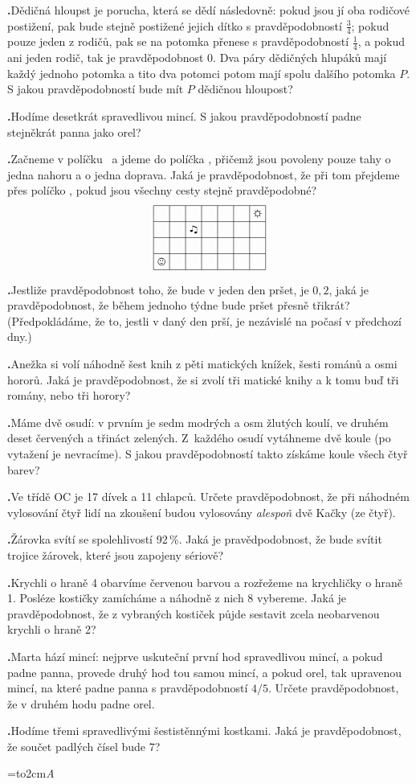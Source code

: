 \documentclass[11pt,a4paper]{article}
\newif\ifst
\def\printtym#1{\setbox\teambox=\hbox to2cm{\huge\textsl{#1}\hfil}\dp\teambox=0pt\relax\def\tym{#1}%
\pr0\relax\priklady\vfill\newpage}
\def\priklad#1#2{\advance\pr1 \noindent\ifst \stfalse\llap{$\star$ }\fi\textbf{\the\pr.}\space\ignorespaces#1\qquad [#2]\par\bigskip}
\let\stt=\sttrue
\begin{document}
{\stt\priklad{Dědičná hloupst je porucha, která se dědí následovně: pokud jsou jí oba rodičové postižení, pak bude stejně postižené jejich dítko s pravděpodobností $\frac34$; pokud pouze jeden z rodičů, pak se na potomka přenese s pravděpodobností $\frac14$, a pokud ani jeden rodič, tak je pravděpodobnost $0$. Dva páry dědičných hlupáků mají každý jednoho potomka a tito dva potomci potom mají spolu dalšího potomka $P$. S jakou pravděpodobností bude mít $P$ dědičnou hloupost?}{$33/64 = \left(\frac34\right)^2 \cdot \frac34 + 2\cdot \frac34 \cdot \frac14 \cdot \frac14$}
\priklad{Hodíme desetkrát spravedlivou mincí. S jakou pravděpodobností padne stejněkrát panna jako orel?}{$\binom{10}5/2^{10} = 63/256$}
\priklad{Začneme v políčku \smiley\ a jdeme do políčka \sun, přičemž jsou povoleny pouze tahy o jedna nahoru a o jedna doprava. Jaká je pravděpodobnost, že při tom přejdeme přes políčko \twonotes, pokud jsou všechny cesty stejně pravděpodobné?
\[ \begin{tikzpicture}[scale=.5] \draw (0,0) grid (7, 4); \node at(.5,.5) {\smiley}; \node at(2.5,2.5) {\twonotes}; \node at(6.5,3.5) {\sun}; \end{tikzpicture} \]}{$5/14 = \binom42 \cdot \binom51 / \binom93$}
\priklad{Jestliže pravděpodobnost toho, že bude v jeden den pršet, je $0{,}2$, jaká je pravděpodobnost, že během jednoho týdne bude pršet přesně třikrát? (Předpokládáme, že to, jestli v daný den prší, je nezávislé na počasí v předchozí dny.)}{$0{,}8^4 \cdot 0{,}2^3 \cdot \binom73 = 1792/15625 = 0{,}114688$}
\priklad{Anežka si volí náhodně šest knih z pěti matických knížek, šesti románů a osmi hororů. Jaká je pravděpodobnost, že si zvolí tři matické knihy a k tomu buď tři romány, nebo tři horory?}{$\binom53 \left(\binom 63 + \binom83\right)/\binom{19}6 = 10/357$}
\priklad{Máme dvě osudí: v prvním je sedm modrých a osm žlutých koulí, ve druhém deset červených a třináct zelených. Z~každého osudí vytáhneme dvě koule (po vytažení je nevracíme). S jakou pravděpodobností takto získáme koule všech čtyř barev?}{$7\cdot8\cdot10\cdot13/(\binom{15}2 \cdot \binom{23}2) = 208/759$}
\priklad{Ve třídě OC je 17 dívek a 11 chlapců. Určete pravděpodobnost, že při náhodném vylosování čtyř lidí na zkoušení budou vylosovány \emph{alespoň} dvě Kačky (ze čtyř).}{$\frac{\binom42 \cdot \binom{24}2 + \binom43 \cdot \binom{24}1 + \binom44 \cdot \binom{24}0}{\binom{28}4} = 1753/20475$}
\priklad{Žárovka svítí se spolehlivostí 92\,\%. Jaká je pravědpodobnost, že bude svítit trojice žárovek, které jsou zapojeny sériově?}{$0{,}92^3$}
\priklad{Krychli o hraně 4 obarvíme červenou barvou a rozřežeme na krychličky o hraně 1. Posléze kostičky zamícháme a náhodně z nich 8 vybereme. Jaká je pravděpodobnost, že z vybraných kostiček půjde sestavit zcela neobarvenou krychli o hraně 2?}{$1$}
\stt\priklad{Marta hází mincí: nejprve uskuteční první hod spravedlivou mincí, a pokud padne panna, provede druhý hod tou samou mincí, a pokud orel, tak upravenou mincí, na které padne panna s pravděpodobností $4/5$. Určete pravděpodobnost, že v druhém hodu padne orel.}{$7/20 = \frac12 \cdot \frac12 + \frac12 \cdot \frac15$}
\priklad{Hodíme třemi spravedlivými šestistěnnými kostkami. Jaká je pravděpodobnost, že součet padlých čísel bude 7?}{$15/6^3 = 5/72$}
}

\printtym{A}
\end{document}
